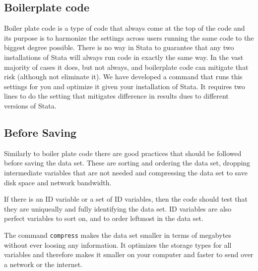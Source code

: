 
\subsection{Boilerplate code}

Boiler plate code is a type of code that always come at the top of the code and its purpose is to harmonize 
the settings across users running the same code to the biggest degree possible. There is no way in Stata to 
guarantee that any two installations of Stata will always run code in exactly the same way. In the vast 
majority of cases it does, but not always, and boilerplate code can mitigate that risk (although not eliminate 
it). We have developed a command that runs this settings for you and optimize it given your installation of 
Stata. It requires two lines to do the setting that mitigates difference in results dues to different versions 
of Stata. 


\subsection{Before Saving}

Similarly to boiler plate code there are good practices that should be followed before saving the data set.	
These are sorting and ordering the data set, dropping intermediate variables that are not needed and 
compressing the data set to save disk space and network bandwidth.

If there is an ID variable or a set of ID variables, then the code should test that they are uniqueally and 
fully identifying the data set. ID 
variables are also perfect variables to sort on, and to order leftmost in the data set.

The command \verb|compress| makes the data set smaller in terms of megabytes without ever loosing any 
information. It optimizes the storage types for all variables and therefore makes it smaller on your computer 
and faster to send over a network or the internet.



\mainmatter
